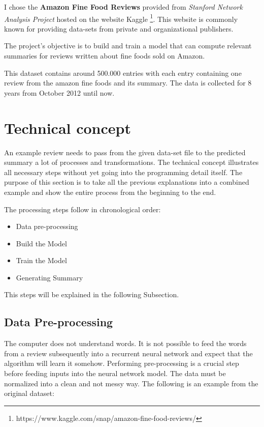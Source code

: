 I chose the \textbf{Amazon Fine Food Reviews} provided from \textit{Stanford Network Analysis Project} hosted on the website Kaggle \footnote{https://www.kaggle.com/snap/amazon-fine-food-reviews/}. This website is commonly known for providing data-sets from private and organizational publishers. 

The project's objective is to build and train a model that can compute relevant summaries for reviews written about fine foods sold on Amazon. 

This dataset contains around 500.000 entries with each entry containing one review from the amazon fine foods and its summary. The data is collected for 8 years from October 2012 until now. 

\section{Technical concept}\label{ss:tc}

An example review needs to pass from the given data-set file to the predicted summary a lot of processes and transformations. The technical concept illustrates all necessary steps without yet going into the programming detail itself. The purpose of this section is to take all the previous explanations into a combined example and show the entire process from the beginning to the end. 

The processing steps follow in chronological order:

\begin{itemize}
	\item Data pre-processing
	\item Build the Model
	\item Train the Model
	\item Generating Summary
\end{itemize}

This steps will be explained in the following Subsection.

\subsection{Data Pre-processing}

The computer does not understand words. It is not possible to feed the words from a review subsequently into a recurrent neural network and expect that the algorithm will learn it somehow. Performing pre-processing is a crucial step before feeding inputs into the neural network model. The data must be normalized into a clean and not messy way. The following is an example from the original dataset:

